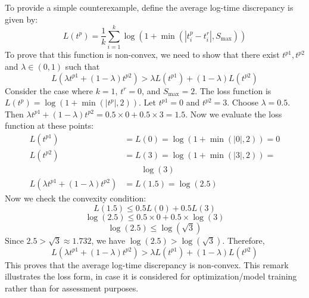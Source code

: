 To provide a simple counterexample, define the average log-time discrepancy is given by:
\[
L(t^p) = \frac{1}{k} \sum_{i=1}^k \log(1 + \min(|t^p_i - t^r_i|, S_{\text{max}}))
\]
To prove that this function is non-convex, we need to show that there exist $t^{p1}, t^{p2}$ and $\lambda \in (0,1)$ such that
\[
L(\lambda t^{p1} + (1-\lambda) t^{p2}) > \lambda L(t^{p1}) + (1-\lambda) L(t^{p2})
\]
Consider the case where $k=1$, $t^r = 0$, and $S_{\text{max}} = 2$. The loss function is $L(t^p) = \log(1 + \min(|t^p|, 2))$.
Let $t^{p1} = 0$ and $t^{p2} = 3$. Choose $\lambda = 0.5$.
Then $\lambda t^{p1} + (1-\lambda) t^{p2} = 0.5 \times 0 + 0.5 \times 3 = 1.5$.
Now we evaluate the loss function at these points:
\begin{align*}
L(t^{p1}) &= L(0) = \log(1 + \min(|0|, 2)) = 0 \\
L(t^{p2}) &= L(3) = \log(1 + \min(|3|, 2)) = \\
    & \qquad \log(3) \\
L(\lambda t^{p1} + (1-\lambda) t^{p2}) &= L(1.5) = \log(2.5)
\end{align*}
Now we check the convexity condition:
\[
L(1.5) \leq 0.5 L(0) + 0.5 L(3)
\]
\[
\log(2.5) \leq 0.5 \times 0 + 0.5 \times \log(3)
\]
\[
\log(2.5) \leq \log(\sqrt{3})
\]
Since $2.5 > \sqrt{3} \approx 1.732$, we have $\log(2.5) > \log(\sqrt{3})$.
Therefore,
\[
L(\lambda t^{p1} + (1-\lambda) t^{p2}) > \lambda L(t^{p1}) + (1-\lambda) L(t^{p2})
\]
This proves that the average log-time discrepancy is non-convex.
This remark illustrates the loss form, in case it is considered for optimization/model training rather than for assessment purposes.




